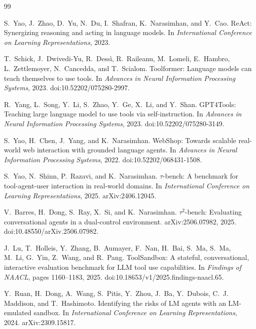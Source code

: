 \documentclass[11pt]{article}
\begin{document}
\begin{thebibliography}{99}

S.~Yao, J.~Zhao, D.~Yu, N.~Du, I.~Shafran, K.~Narasimhan, and Y.~Cao.
\newblock ReAct: Synergizing reasoning and acting in language models.
\newblock In \emph{International Conference on Learning Representations}, 2023.

T.~Schick, J.~Dwivedi-Yu, R.~Dess\`i, R.~Raileanu, M.~Lomeli, E.~Hambro, L.~Zettlemoyer, N.~Cancedda, and T.~Scialom.
\newblock Toolformer: Language models can teach themselves to use tools.
\newblock In \emph{Advances in Neural Information Processing Systems}, 2023. doi:10.52202/075280-2997.

R.~Yang, L.~Song, Y.~Li, S.~Zhao, Y.~Ge, X.~Li, and Y.~Shan.
\newblock GPT4Tools: Teaching large language model to use tools via self-instruction.
\newblock In \emph{Advances in Neural Information Processing Systems}, 2023. doi:10.52202/075280-3149.

S.~Yao, H.~Chen, J.~Yang, and K.~Narasimhan.
\newblock WebShop: Towards scalable real-world web interaction with grounded language agents.
\newblock In \emph{Advances in Neural Information Processing Systems}, 2022. doi:10.52202/068431-1508.

S.~Yao, N.~Shinn, P.~Razavi, and K.~Narasimhan.
\newblock $\tau$-bench: A benchmark for tool-agent-user interaction in real-world domains.
\newblock In \emph{International Conference on Learning Representations}, 2025. arXiv:2406.12045.

V.~Barres, H.~Dong, S.~Ray, X.~Si, and K.~Narasimhan.
\newblock $\tau^2$-bench: Evaluating conversational agents in a dual-control environment.
\newblock arXiv:2506.07982, 2025. doi:10.48550/arXiv.2506.07982.

J.~Lu, T.~Holleis, Y.~Zhang, B.~Aumayer, F.~Nan, H.~Bai, S.~Ma, S.~Ma, M.~Li, G.~Yin, Z.~Wang, and R.~Pang.
\newblock ToolSandbox: A stateful, conversational, interactive evaluation benchmark for LLM tool use capabilities.
\newblock In \emph{Findings of NAACL}, pages 1160--1183, 2025. doi:10.18653/v1/2025.findings-naacl.65.

Y.~Ruan, H.~Dong, A.~Wang, S.~Pitis, Y.~Zhou, J.~Ba, Y.~Dubois, C.~J. Maddison, and T.~Hashimoto.
\newblock Identifying the risks of LM agents with an LM-emulated sandbox.
\newblock In \emph{International Conference on Learning Representations}, 2024. arXiv:2309.15817.


\end{thebibliography}
\end{document}
